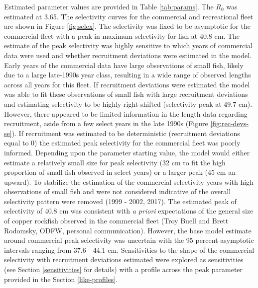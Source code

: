 \documentclass[11pt,
  english,
  a4paper,
]{article}
\begin{document}
\leavevmode\tagmcend\tagstructend


Estimated parameter values are provided in Table \ref{tab:params}. The {\(R_0\)\leavevmode\tagmcend\tagstructend} was estimated at 3.65. The selectivity curves for the commercial and recreational fleet are shown in Figure \ref{fig:selex}. The selectivity was fixed to be asymptotic for the commercial fleet with a peak in maximum selectivity for fish at 40.8 cm. The estimate of the peak selectivity was highly sensitive to which years of commercial data were used and whether recruitment deviations were estimated in the model. Early years of the commercial data have large observations of small fish, likely due to a large late-1990s year class, resulting in a wide range of observed lengths across all years for this fleet. If recruitment deviations were estimated the model was able to fit these observations of small fish with large recruitment deviations and estimating selectivity to be highly right-shifted (selectivity peak at 49.7 cm). However, there appeared to be limited information in the length data regarding recruitment, aside from a few select years in the late 1990s (Figure \ref{fig:rec-devs-se}). If recruitment was estimated to be deterministic (recruitment deviations equal to 0) the estimated peak selectivity for the commercial fleet was poorly informed. Depending upon the parameter starting value, the model would either estimate a relatively small size for peak selectivity (32 cm to fit the high proportion of small fish observed in select years) or a larger peak (45 cm an upward). To stabilize the estimation of the commercial selectivity years with high observations of small fish and were not considered indicative of the overall selectivity pattern were removed (1999 - 2002, 2017). The estimated peak of selectivity of 40.8 cm was consistent with \emph{a priori} expectations of the general size of copper rockfish observed in the commercial fleet (Troy Buell and Brett Rodomsky, ODFW, personal communication). However, the base model estimate around commercial peak selectivity was uncertain with the 95 percent asymptotic intervals ranging from 37.6 - 44.1 cm. Sensitivities to the shape of the commercial selectivity with recruitment deviations estimated were explored as sensitivities (see Section \ref{sensitivities} for details) with a profile across the peak parameter provided in the Section \ref{like-profiles}.
\end{document}
